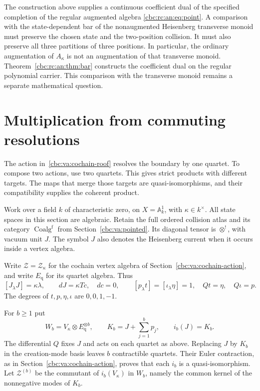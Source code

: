 The construction above supplies a continuous coefficient dual of the
specified completion of the regular augmented algebra
\eqref{cbc:rc:an:eq:point}. A comparison with the state-dependent bar of the nonaugmented
Heisenberg transverse monoid must preserve the chosen state and
the two-position collision. It must also preserve all three
partitions of three positions. In particular, the ordinary augmentation
of \(A_\kappa\) is not an augmentation of that transverse monoid.
Theorem~\ref{cbc:rc:an:thm:bar} constructs the coefficient dual on the
regular polynomial carrier. This comparison with the transverse
monoid remains a separate mathematical question.

\section{Multiplication from commuting resolutions}
\label{cbc:rc:tower}

The action in~\eqref{cbc:va:cochain-roof} resolves the boundary by
one quartet. To compose two actions, use two quartets. This gives
strict products with different targets. The maps that merge those
targets are quasi-isomorphisms, and their compatibility supplies the
coherent product.

Work over a field $k$ of characteristic zero, on $X=\mathbb A^1_k$,
with $\kappa\in k^\times$. All state spaces in this section are
algebraic. Retain the full ordered collision atlas and its category
$\operatorname{Coalg}^{\mathrm f}$ from
Section~\ref{cbc:va:pointed}. Its diagonal tensor is $\otimes^!$,
with vacuum unit $J$. The symbol $J$ also denotes the Heisenberg
current when it occurs inside a vertex algebra.

Write $\mathcal Z=\mathcal Z_\kappa$ for the cochain vertex algebra
of Section~\ref{cbc:va:cochain-action}, and write $E_{\mathrm q}$
for its quartet algebra. Thus
\[
 [J_\lambda J]=\kappa\lambda,\qquad dJ=\kappa Tc,\quad dc=0,
 \qquad
 [p_\lambda t]=[\iota_\lambda\eta]=1,
 \quad Qt=\eta,\quad Q\iota=p.
\]
The degrees of $t,p,\eta,\iota$ are $0,0,1,-1$.

For $b\geq1$ put
\[
 W_b=V_\kappa\otimes E_{\mathrm q}^{\otimes b},\qquad
 K_b=J+\sum_{j=1}^b p_j,
 \qquad i_b(J)=K_b.
\]
The differential $Q$ fixes $J$ and acts on each quartet as above.
Replacing $J$ by $K_b$ in the creation-mode basis leaves $b$
contractible quartets. Their Euler contraction, as in
Section~\ref{cbc:va:cochain-action}, proves that each $i_b$ is a
quasi-isomorphism. Let $\mathcal Z^{(b)}$ be the commutant of
$i_b(V_\kappa)$ in $W_b$, namely the common kernel of the
nonnegative modes of $K_b$.


